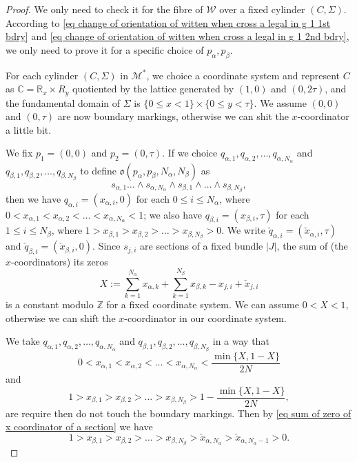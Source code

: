 \documentclass[10pt,a4paper]{amsart}
\begin{document}
\begin{proof}
    We only need to check it for the fibre of $\mathcal W$ over a fixed cylinder $(C,\Sigma)$. According to \eqref{eq change of orientation of witten when cross a legal in g 1 1st bdry} and \eqref{eq change of orientation of witten when cross a legal in g 1 2nd bdry}, we only need to prove it for a specific choice of $p_\alpha,p_\beta$.

    For each cylinder $(C,\Sigma)$ in $\mathcal M^*$, we choice a coordinate system and represent $C$ as $\mathbb C=\mathbb R_x\times R_y$ quotiented by the lattice generated by $(1,0)$ and $(0,2\tau)$, and the fundamental domain of $\Sigma$ is $\{0\le x < 1\}\times \{0\le y < \tau\}$. We assume $(0,0)$ and $(0,\tau)$ are now boundary markings, otherwise we can shit the $x$-coordinator a little bit.

    We fix $p_1=(0,0)$ and $p_2=(0,\tau).$ If we choice $q_{\alpha,1},q_{\alpha,2},\dots,q_{\alpha,{N_\alpha}}$ and $q_{\beta,1},q_{\beta,2},\dots,q_{\beta,{N_\beta}}$ to define $\mathfrak o(p_\alpha,p_\beta,N_\alpha,N_\beta)$ as 
    $$
    s_{\alpha,1}\dots \wedge s_{\alpha,N_\alpha}\wedge s_{\beta,1}\wedge \dots \wedge s_{\beta,N_\beta},
    $$
    then we have $q_{\alpha,i}=(x_{\alpha,i},0)$ for each $0\le i \le N_\alpha$, where $0< x_{\alpha,1}<x_{\alpha,2}<\dots<x_{\alpha,N_\alpha}<1$; we also have $q_{\beta,i}=(x_{\beta,i},\tau)$ for each $1\le i \le N_\beta$, where $1> x_{\beta,1}>x_{\beta,2}>\dots>x_{\beta,N_\beta}>0$. We write $\check{q}_{\alpha,i}=(\check{x}_{\alpha,i},\tau)$ and $\check{q}_{\beta,i}=(\check{x}_{\beta,i},0)$.
    Since $s_{j,i}$ are sections of a fixed bundle $\lvert J \rvert$, the sum of (the $x$-coordinators) its zeros 
    \begin{equation}\label{eq sum of zero of x coordinator of a section}
        X:=\sum_{k=1}^{N_\alpha} x_{\alpha,k}+  \sum_{k=1}^{N_\beta} x_{\beta,k} -x_{j,i} + \check{x}_{j,i}
    \end{equation}
    is a constant modulo $\mathbb Z$ for a fixed coordinate system. We can assume $0< X < 1$, otherwise we can shift the $x$-coordinator in our coordinate system.

    We take  $q_{\alpha,1},q_{\alpha,2},\dots,q_{\alpha,{N_\alpha}}$ and $q_{\beta,1},q_{\beta,2},\dots,q_{\beta,{N_\beta}}$ in a way that 
    $$0< x_{\alpha,1}<x_{\alpha,2}<\dots<x_{\alpha,N_\alpha}<\frac{\operatorname{min}\{X,1-X\}}{2N}$$ 
    and 
    $$1> x_{\beta,1}>x_{\beta,2}>\dots>x_{\beta,N_\beta}>1-\frac{\operatorname{min}\{X,1-X\}}{2N},$$ 
    are require then do not touch the boundary markings. Then by \eqref{eq sum of zero of x coordinator of a section} we have 
    $$1> x_{\beta,1}>x_{\beta,2}>\dots>x_{\beta,N_\beta}> \check{x}_{\alpha,N_\alpha}> \check{x}_{\alpha,N_\alpha-1}>0.$$


\end{proof}
\end{document}
